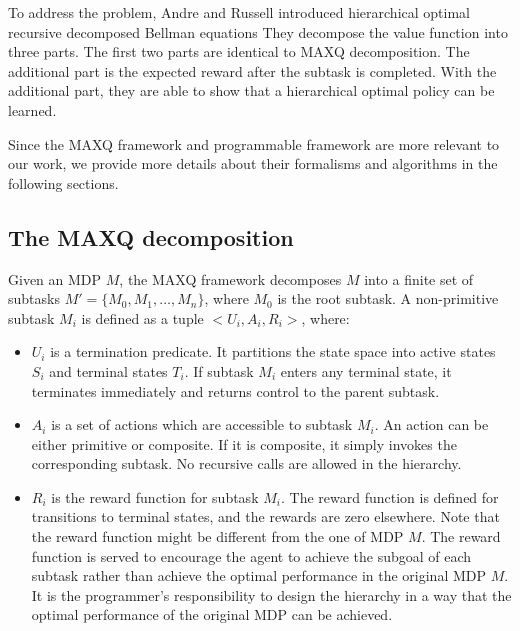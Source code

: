 To address the problem,
Andre and Russell \cite{Andre02, HORDQ} introduced hierarchical optimal recursive decomposed Bellman equations
They decompose the value function into three parts. The first two parts are identical to MAXQ decomposition.
The additional part is the expected reward after the subtask is completed.
With the additional part, they are able to show that a hierarchical optimal policy can be learned.

Since the MAXQ framework and programmable framework are more relevant to our work,
we provide more details about their formalisms and algorithms in the following sections.

\subsection{The MAXQ decomposition}

\begin{definition}
    Given an MDP $M$, the MAXQ framework decomposes $M$ into a finite
    set of subtasks $M' = \{M_0, M_1, \dots, M_n\}$, where $M_0$ is the root subtask. 
    A non-primitive subtask $M_i$ is defined as a tuple $<U_i, A_i, R_i>$, where:
    \begin{itemize}
    \item $U_i$ is a termination predicate. It partitions the state space into active states $S_i$ and
                terminal states $T_i$. If subtask $M_i$ enters any terminal state, it terminates immediately
                and returns control to the parent subtask. 
    \item $A_i$ is a set of actions which are accessible to subtask $M_i$. An action can be either primitive or composite.
                If it is composite, it simply invokes the corresponding subtask. No recursive calls 
                are allowed in the hierarchy.
    \item $R_i$ is the reward function for subtask $M_i$. The reward function is defined for transitions to terminal states, and the rewards are zero elsewhere. Note
        that the reward function might be different from the one of MDP $M$. The reward function is served to encourage the agent to achieve 
        the subgoal of each subtask rather than achieve the optimal performance in the original MDP $M$. It is the programmer's responsibility
        to design the hierarchy in a way that the optimal performance of the original MDP can be achieved.
    \end{itemize}
\end{definition}

